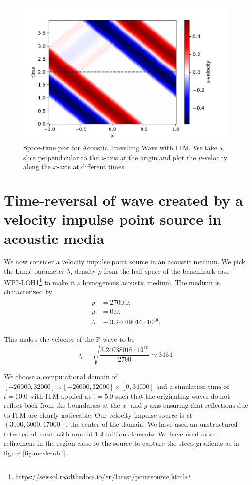 \begin{figure}[htpb]
    \centering
    \includegraphics[width=0.75\linewidth]{figures/space-time-plot-travelling.pdf}
    \caption{Space-time plot for Acoustic Travelling Wave with \ac{ITM}. We take a slice perpendicular to the $z$-axis at the origin and plot the $u$-velocity along the $x$-axis at different times.}
    \label{fig:space-timeplot-travelling}
\end{figure}

\section{Time-reversal of wave created by a velocity impulse point source in acoustic media} \label{sec:acousticITM}

We now consider a velocity impulse point source in an acoustic medium. We pick the Lam\'{e} parameter $\lambda$, density $\rho$ 
from the half-space of the benchmark case WP2-LOH1\footnote[1]{https://seissol.readthedocs.io/en/latest/pointsource.html} to make it a homogenous acoustic medium. 
The medium is characterized by
\begin{align}
    \begin{split}
        \rho &=    2700.0 ,\\
        \mu &=     0.0 ,\\
        \lambda &= 3.24038016 \cdot 10^{10} .
    \end{split}
\end{align}

This makes the velocity of the P-wave to be
\begin{equation}
    v_p = \sqrt{\frac{3.24038016 \cdot 10^{10}}{2700}} \approx 3464 .
\end{equation}

We choose a computational domain of $\left[-26000,32000\right] \times \left[-26000,32000\right] \times \left[0,34000\right]$ and a simulation time of $t=10.0$ with \ac{ITM} applied at $t=5.0$ 
such that the originating waves do not reflect back from the boundaries at the $x$- and $y$-axis ensuring that
reflections due to \ac{ITM} are clearly noticeable. Our velocity impulse source is at $\left(3000,3000,17000\right)$, the center of the domain. 
We have used an unstructured tetrahedral mesh with around 1.4 million elements. We have used more refinement in the region close to the source to capture the steep gradients as in figure \ref{fig:mesh-loh1}.

